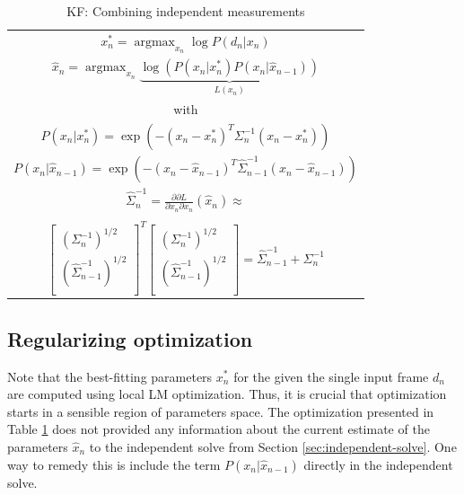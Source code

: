 \documentclass[10pt,twocolumn,letterpaper]{article}
\begin{document}
\begin{table}[!h] 
\centering
\caption{KF: Combining independent measurements\label{tab:kf-like}} 
\begin{tabular}{|c|}
\hline
$x_n^* = \operatorname{argmax}_{x_n} \log P(d_n|x_n)$ \\
$\hat{x}_n = \operatorname{argmax}_{x_n} \underbrace{\log \left( P(x_n|x_n^*) P(x_n |\hat{x}_{n - 1}) \right)}_{L(x_n)}$\\
with \\
$P(x_n |x_n^*) = \exp \left( - (x_n - x_n^* )^T \Sigma_n^{-1}(x_n - x_n^* )\right)$ \\
$P(x_n |\hat{x}_{n - 1}) = \exp \left( - (x_n - \hat{x}_{n - 1} )^T \hat{\Sigma}_{n - 1}^{-1} (x_n - \hat{x}_{n - 1} )\right)$ \\	

$\hat{\Sigma}_n^{-1} = \frac{\partial \partial L}{\partial x_n \partial x_n}(\hat{x}_n) \approx $ \\
\\
$\left[
	\begin{array}{cc}
		\left(\Sigma_n^{-1}\right)^{1/2} \\
		\left(\hat{\Sigma}_{n - 1}^{-1}\right)^{1/2} \\
	\end{array}
\right]^T 
\left[
	\begin{array}{c}
		\left(\Sigma_n^{-1}\right)^{1/2} \\
		\left(\hat{\Sigma}_{n - 1}^{-1}\right)^{1/2} \\
	\end{array}
\right] = \hat{\Sigma}_{n-1}^{-1}  + \Sigma_{n}^{-1}$ \\

\hline
\end{tabular}
\end{table}

\subsection{Regularizing optimization}

Note that the best-fitting parameters $x_n^*$ for the given the single input frame $d_n$ are computed using local LM optimization. Thus, it is crucial that optimization starts in a sensible region of parameters space. The optimization presented in Table \ref{tab:kf-like} does not provided any information about the current estimate of the parameters $\hat{x}_n$ to the independent solve from Section \ref{sec:independent-solve}. One way to remedy this is include the term $P(x_n |\hat{x}_{n - 1})$ directly in the independent solve.
\end{document}
